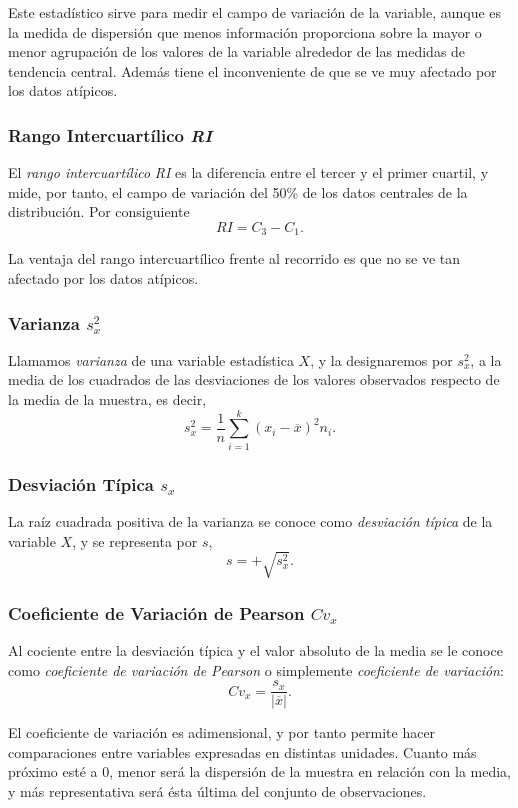 Este estadístico sirve para medir el campo de variación de la variable, aunque es la medida de dispersión que menos
información proporciona sobre la mayor o menor agrupación de los valores de la variable alrededor de las medidas de
tendencia central. 
Además tiene el inconveniente de que se ve muy afectado por los datos atípicos.

\subsubsection{Rango Intercuartílico \textit{RI}}
El \emph{rango intercuartílico} \textit{RI} es la diferencia entre el tercer y el primer cuartil, y mide, por tanto, el
campo de variación del 50\% de los datos centrales de la distribución. 
Por consiguiente 
\[
RI=C_3-C_1.
\]

La ventaja del rango intercuartílico frente al recorrido es que no se ve tan afectado por los datos atípicos.

\subsubsection{Varianza $\textit{s}_\textit{x}^\textrm{2}$}
Llamamos \emph{varianza} de una variable estadística $X$, y la designaremos por $\textit{s}_\textit{x}^\textrm{2}$, a la
media de los cuadrados de las desviaciones de los valores observados respecto de la media de la muestra, es decir,
\[
s_x^{2}=\frac{1}{n}\sum_{i=1}^{k}(x_i-\overline{x})^{2}n_i.
\]

\subsubsection{Desviación Típica $\textit{s}_\textit{x}$}
La raíz cuadrada positiva de la varianza se conoce como \emph{desviación típica} de la variable $X$, y se representa por
$s$, 
\[
s=+\sqrt{s_{x}^{2}}.
\]

\subsubsection{Coeficiente de Variación de Pearson $\textit{Cv}_\textit{x}$}
Al cociente entre la desviación típica y el valor absoluto de la media se le conoce como \emph{coeficiente de variación
de Pearson} o simplemente \emph{coeficiente de variación}:
\[
Cv_x=\frac{s_x}{|\overline{x}|}.
\]

El coeficiente de variación es adimensional, y por tanto permite hacer comparaciones entre variables expresadas en
distintas unidades.
Cuanto más próximo esté a 0, menor será la dispersión de la muestra en relación con la media, y más representativa será
ésta última del conjunto de observaciones.

